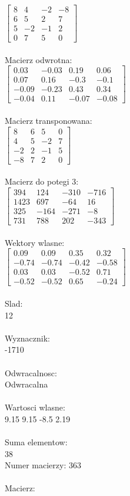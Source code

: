 \documentclass[a4paper,12pt]{article}
\begin{document}
$\begin{bmatrix} 8&4&-2&-8\\6&5&2&7\\5&-2&-1&2\\0&7&5&0 \end{bmatrix}$
\\
\\
Macierz odwrotna:\\

$\begin{bmatrix} 0.03&-0.03&0.19&0.06\\0.07&0.16&-0.3&-0.1\\-0.09&-0.23&0.43&0.34\\-0.04&0.11&-0.07&-0.08 \end{bmatrix}$
\\
\\
Macierz transponowana:\\

$\begin{bmatrix} 8&6&5&0\\4&5&-2&7\\-2&2&-1&5\\-8&7&2&0 \end{bmatrix}$
\\
\\
Macierz do potegi 3:\\

$\begin{bmatrix} 394&124&-310&-716\\1423&697&-64&16\\325&-164&-271&-8\\731&788&202&-343 \end{bmatrix}$
\\
\\
Wektory wlasne:\\

$\begin{bmatrix} 0.09&0.09&0.35&0.32\\-0.74&-0.74&-0.42&-0.58\\0.03&0.03&-0.52&0.71\\-0.52&-0.52&0.65&-0.24 \end{bmatrix}$
\\
\\
Slad:\\
12
\\
\\
Wyznacznik:\\
-1710
\\
\\
Odwracalnosc:\\
Odwracalna
\\
\\
Wartosci wlasne:\\
9.15 9.15 -8.5 2.19
\\
\\
Suma elementow:\\
38
\\
\newpage
Numer macierzy:
363
\\
\\
Macierz:\\
\end{document}
